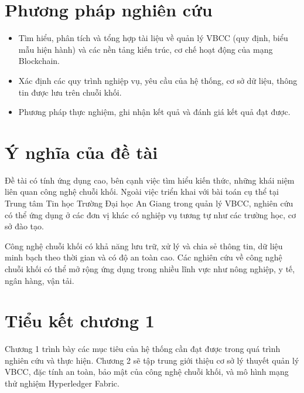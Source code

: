 \section{Phương pháp nghiên cứu}

\begin{itemize}
\item Tìm hiểu, phân tích và tổng hợp tài liệu về quản lý VBCC (quy định, biểu mẫu hiện hành) và các nền tảng kiến trúc, cơ chế hoạt động của mạng Blockchain.
\item Xác định các quy trình nghiệp vụ, yêu cầu của hệ thống, cơ sở dữ liệu, thông tin được lưu trên chuỗi khối.
\item Phương pháp thực nghiệm, ghi nhận kết quả và đánh giá kết quả đạt được.
\end{itemize}
\section{Ý nghĩa của đề tài}

Đề tài có tính ứng dụng cao, bên cạnh việc tìm hiểu kiến thức, những khái niệm liên quan công nghệ chuỗi khối.
Ngoài việc triển khai với bài toán cụ thể tại Trung tâm Tin học Trường Đại học An Giang trong quản lý VBCC, nghiên cứu có thể ứng dụng ở các đơn vị khác có nghiệp vụ tương tự như các trường học, cơ sở đào tạo.

Công nghệ chuỗi khối có khả năng lưu trữ, xử lý và chia sẻ thông tin, dữ liệu minh bạch theo thời gian và có độ an toàn cao. Các nghiên cứu về công nghệ chuỗi khối có thể mở rộng ứng dụng trong nhiều lĩnh vực như nông nghiệp, y tế, ngân hàng, vận tải.
\section{Tiểu kết chương 1}

Chương 1 trình bày các mục tiêu của hệ thống cần đạt được trong quá trình nghiên cứu và thực hiện. Chương 2 sẽ tập trung giới thiệu cơ sở lý thuyết quản lý VBCC, đặc tính an toàn, bảo mật của công nghệ chuỗi khối, và mô hình mạng thử nghiệm Hyperledger Fabric.
